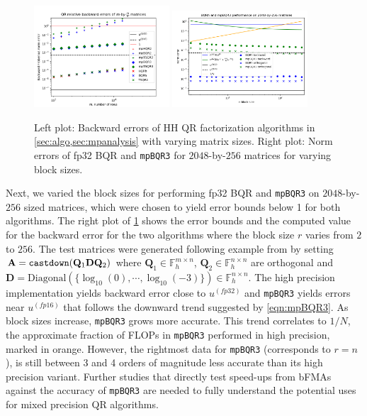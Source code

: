 \documentclass[review,onefignum,onetabnum]{siamart190516}
\newcommand{\F}{\mathbb{F}}
\newcommand{\bb}[1]{\mathbf{#1}}
\begin{document}
\begin{figure}[h!]
	\centering
	\vspace{-10pt}
	\includegraphics[width=0.45\textwidth]{./figures/sizefig.png}
	\includegraphics[width=0.45\textwidth]{./figures/mpBQR3-blocksize-1108.png}
	\caption{\label{fig:sizemp3}Left plot: Backward errors of HH QR factorization algorithms in \cref{sec:algo,sec:mpanalysis} with varying matrix sizes.
		Right plot: Norm errors of fp32 BQR and {\tt mpBQR3} for $2048$-by-$256$ matrices for varying block sizes.}
	\vspace{-10pt}
\end{figure} 

Next, we varied the block sizes for performing fp32 BQR and {\tt mpBQR3} on $2048$-by-$256$ sized matrices, which were chosen to yield error bounds below 1 for both algorithms.
The right plot of \cref{fig:sizemp3} shows the error bounds and the computed value for the backward error for the two algorithms where the block size $r$ varies from $2$ to $256$. 
The test matrices were generated following example from \cite{Blanchard2020} by setting $\bb{A}={\tt castdown}(\bb{Q}_1\bb{D}\bb{Q}_2)$ where $\bb{Q}_1\in\F_h^{m\times n}$, $\bb{Q}_2\in\F_h^{n\times n}$ are orthogonal and $\bb{D}=\mathrm{Diagonal}(\{\log_{10}(0),\cdots, \log_{10}(-3)\})\in\F_h^{n\times n}$.  
The high precision implementation yields backward error close to $u^{(fp32)}$ and {\tt mpBQR3} yields errors near $u^{(fp16)}$ that follows the downward trend suggested by \cref{eqn:mpBQR3}.
As block sizes increase, {\tt mpBQR3} grows more accurate. 
This trend correlates to $1/N$, the approximate fraction of FLOPs in {\tt mpBQR3} performed in high precision, marked in orange.
However, the rightmost data for {\tt mpBQR3} (corresponds to $r=n$), is still between 3 and 4 orders of magnitude less accurate than its high precision variant. 
Further studies that directly test speed-ups from bFMAs against the accuracy of {\tt mpBQR3} are needed to fully understand the potential uses for mixed precision QR algorithms.
\end{document}
